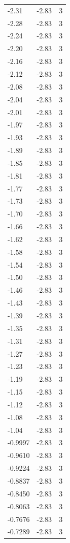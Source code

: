 \begin{longtable}{lrr}
  -2.31 & -2.83 & 3 \\
  -2.28 & -2.83 & 3 \\
  -2.24 & -2.83 & 3 \\
  -2.20 & -2.83 & 3 \\
  -2.16 & -2.83 & 3 \\
  -2.12 & -2.83 & 3 \\
  -2.08 & -2.83 & 3 \\
  -2.04 & -2.83 & 3 \\
  -2.01 & -2.83 & 3 \\
  -1.97 & -2.83 & 3 \\
  -1.93 & -2.83 & 3 \\
  -1.89 & -2.83 & 3 \\
  -1.85 & -2.83 & 3 \\
  -1.81 & -2.83 & 3 \\
  -1.77 & -2.83 & 3 \\
  -1.73 & -2.83 & 3 \\
  -1.70 & -2.83 & 3 \\
  -1.66 & -2.83 & 3 \\
  -1.62 & -2.83 & 3 \\
  -1.58 & -2.83 & 3 \\
  -1.54 & -2.83 & 3 \\
  -1.50 & -2.83 & 3 \\
  -1.46 & -2.83 & 3 \\
  -1.43 & -2.83 & 3 \\
  -1.39 & -2.83 & 3 \\
  -1.35 & -2.83 & 3 \\
  -1.31 & -2.83 & 3 \\
  -1.27 & -2.83 & 3 \\
  -1.23 & -2.83 & 3 \\
  -1.19 & -2.83 & 3 \\
  -1.15 & -2.83 & 3 \\
  -1.12 & -2.83 & 3 \\
  -1.08 & -2.83 & 3 \\
  -1.04 & -2.83 & 3 \\
  -0.9997 & -2.83 & 3 \\
  -0.9610 & -2.83 & 3 \\
  -0.9224 & -2.83 & 3 \\
  -0.8837 & -2.83 & 3 \\
  -0.8450 & -2.83 & 3 \\
  -0.8063 & -2.83 & 3 \\
  -0.7676 & -2.83 & 3 \\
  -0.7289 & -2.83 & 3 \\

\end{longtable}
